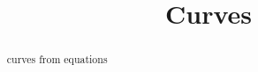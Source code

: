 \documentclass{ximera}
\title{Curves}
\begin{document}
\begin{abstract}
curves from equations
\end{abstract}
\maketitle
\end{document}
